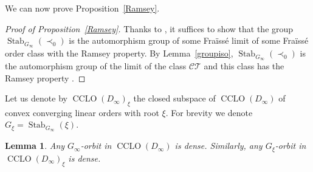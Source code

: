 \documentclass[JEP,XML,SOM,Unicode,NoFloatCountersInSection]{cedram}
\let\mathcal\mathscr
\theoremstyle{plain}
\newtheorem{lem}[thm]{Lemma}
\theoremstyle{definition}
\newcommand{\cCT}{\mathcal{CT}}
\DeclareMathOperator{\Stab}{Stab}
\DeclareMathOperator{\CLO}{CCLO}
\begin{document}
We can now prove Proposition~\ref{Ramsey}.
\begin{proof} [Proof of Proposition~\ref{Ramsey}] Thanks to \cite[Th.\,4.7]{MR2140630}, it suffices to show that the group $\Stab_{G_\infty}(\prec_0)$ is the automorphism group of some Fraïssé limit of some Fraïssé order class with the Ramsey property. By Lemma~\ref{groupiso}, $\Stab_{G_\infty}(\prec_0)$ is the automorphism group of the limit of the class $\cCT$ and this class has the Ramsey property \cite[Th.\,2]{MR3436366}.
\end{proof}

Let us denote by $\CLO(D_\infty)_{\xi}$ the closed subspace of $\CLO(D_\infty)$ of convex converging linear orders with root $\xi$. For brevity we denote $G_{\xi}=\Stab_{G_\infty}(\xi).$

\begin{lem}\label{minimality}Any $G_\infty$-orbit in $\CLO(D_\infty)$ is dense. Similarly, any $G_{\xi}$-orbit in $\CLO(D_\infty)_{\xi}$ is dense.
\end{lem}
\end{document}
